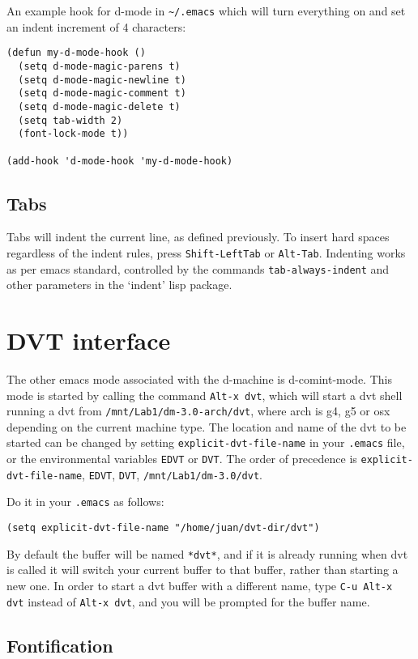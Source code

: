 \documentclass[12pt]{article}
\begin{document}
An example hook for d-mode in {\tt\verb$~/.$emacs} which will turn
everything on and set an indent increment of 4 characters:
\begin{verbatim}
(defun my-d-mode-hook ()
  (setq d-mode-magic-parens t)
  (setq d-mode-magic-newline t)
  (setq d-mode-magic-comment t)
  (setq d-mode-magic-delete t)
  (setq tab-width 2)
  (font-lock-mode t))

(add-hook 'd-mode-hook 'my-d-mode-hook)
\end{verbatim}
\subsection{Tabs}
  
Tabs will indent the current line, as defined previously.  To insert
hard spaces regardless of the indent rules, press
\verb$Shift-LeftTab$ or \verb$Alt-Tab$.  Indenting works as per emacs
standard, controlled by the commands \verb$tab-always-indent$ and
other parameters in the `indent' lisp package.

\section{DVT interface}
  
The other emacs mode associated with the d-machine is d-comint-mode.
This mode is started by calling the command \verb$Alt-x dvt$, which
will start a dvt shell running a dvt from
\texttt{/mnt/Lab1/dm-3.0-arch/dvt}, where arch is g4, g5 or osx
depending on the current machine type. The location and name of the
dvt to be started can be changed by setting
\verb$explicit-dvt-file-name$ in your \texttt{.emacs} file, or the
environmental variables \verb$EDVT$ or \verb$DVT$. The order of
precedence is \verb$explicit-dvt-file-name$, \verb$EDVT$, \verb$DVT$,
\texttt{/mnt/Lab1/dm-3.0/dvt}.

Do it in your \texttt{.emacs} as follows:
\begin{verbatim}
(setq explicit-dvt-file-name "/home/juan/dvt-dir/dvt")
\end{verbatim}
By default the buffer will be named \texttt{*dvt*}, and if it is
already running when dvt is called it will switch your current buffer
to that buffer, rather than starting a new one. In order to start a
dvt buffer with a different name, type \verb$C-u Alt-x dvt$ instead
of \verb$Alt-x dvt$, and you will be prompted for the buffer name.

\subsection{Fontification}
\end{document}
